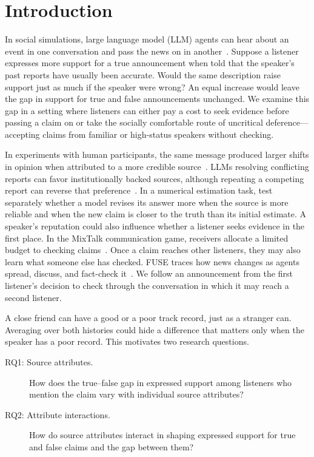 \section{Introduction}
\label{sec:intro}

In social simulations, large language model (LLM) agents can hear about an event in one conversation and pass the news on in another~\citep{park2023generative,chuang-etal-2024-simulating}. Suppose a listener expresses more support for a true announcement when told that the speaker's past reports have usually been accurate. Would the same description raise support just as much if the speaker were wrong? An equal increase would leave the gap in support for true and false announcements unchanged. We examine this gap in a setting where listeners can either pay a cost to seek evidence before passing a claim on or take the socially comfortable route of uncritical deference---accepting claims from familiar or high-status speakers without checking.

In experiments with human participants, the same message produced larger shifts in opinion when attributed to a more credible source~\citep{hovland1951source}. LLMs resolving conflicting reports can favor institutionally backed sources, although repeating a competing report can reverse that preference~\citep{schuster-etal-2026-whose}. In a numerical estimation task, \citet{ashkinaze2026informationdiscernmentlargelanguage} test separately whether a model revises its answer more when the source is more reliable and when the new claim is closer to the truth than its initial estimate. A speaker's reputation could also influence whether a listener seeks evidence in the first place. In the MixTalk communication game, receivers allocate a limited budget to checking claims~\citep{mahmud2026verification}. Once a claim reaches other listeners, they may also learn what someone else has checked. FUSE traces how news changes as agents spread, discuss, and fact-check it~\citep{liu-etal-2025-stepwise}. We follow an announcement from the first listener's decision to check through the conversation in which it may reach a second listener.

A close friend can have a good or a poor track record, just as a stranger can. Averaging over both histories could hide a difference that matters only when the speaker has a poor record. This motivates two research questions.

\begin{description}
    \item[RQ1: Source attributes.] How does the true--false gap in expressed support among listeners who mention the claim vary with individual source attributes?
    \item[RQ2: Attribute interactions.] How do source attributes interact in shaping expressed support for true and false claims and the gap between them?
\end{description}

